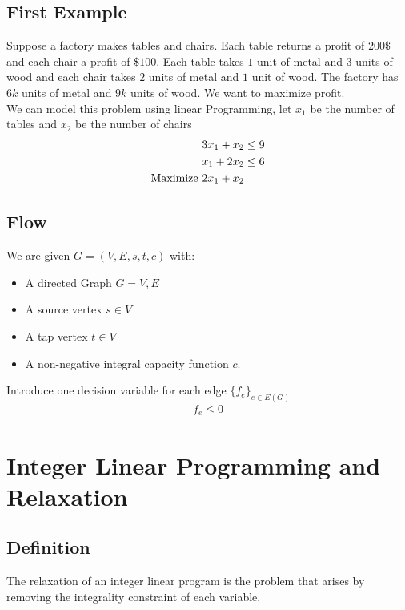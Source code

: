 \documentclass[12pt]{cours}
\begin{document}
\subsection{First Example}
Suppose a factory makes tables and chairs. Each table returns a profit of $200\$$ and each chair a profit of $\$100$. Each table takes $1$ unit of metal and $3$ units of wood and each chair takes $2$ units of metal and $1$ unit of wood. The factory has $6k$ units of metal and $9k$ units of wood. We want to maximize profit.\\
We can model this problem using linear Programming, let $x_{1}$ be the number of tables and $x_{2}$ be the number of chairs
\[
    \begin{aligned}
        3x_{1} + x_{2} &\leq 9\\
        x_{1} + 2x_{2} &\leq 6\\
        \textnormal{Maximize } 2x_{1} + x_{2}
    \end{aligned}
\]

\subsection{Flow}
\begin{proposition}
    We are given $G = (V, E, s, t, c)$ with:
    \begin{itemize}
        \item A directed Graph $G = V, E$
        \item A source vertex $s \in V$
        \item A tap vertex $t\in V$
        \item A non-negative integral capacity function $c$.
    \end{itemize}
    Introduce one decision variable for each edge $\{f_{e}\}_{e \in E(G)}$
    \[
        \begin{aligned}
            f_{e} \leq 0
        \end{aligned}
    \]
\end{proposition}

\section{Integer Linear Programming and Relaxation}
\subsection{Definition}
\begin{definition}
    The relaxation of an integer linear program is the problem that arises by removing the integrality constraint of each variable.
\end{definition}
\end{document}
